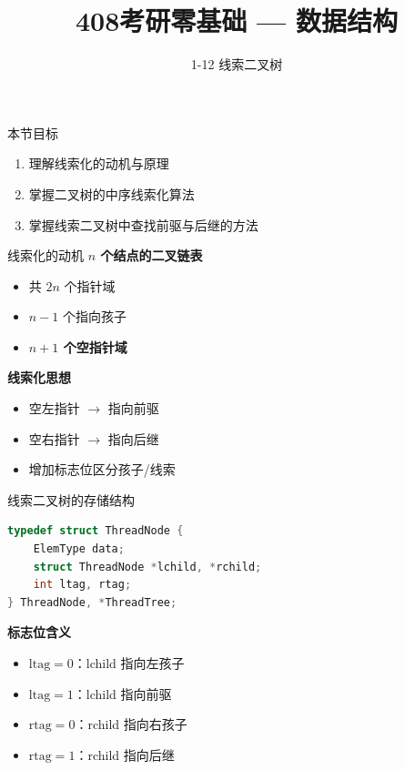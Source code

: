 \documentclass[10pt, aspectratio=169]{beamer}
\title{408考研零基础 --- 数据结构}
\subtitle{1-12 线索二叉树}
\author{}
\date{}
\begin{document}
\begin{frame}{本节目标}
    \begin{enumerate}
        \item 理解线索化的动机与原理
        \item 掌握二叉树的中序线索化算法
        \item 掌握线索二叉树中查找前驱与后继的方法
    \end{enumerate}
\end{frame}

\begin{frame}{线索化的动机}
    \textbf{$n$ 个结点的二叉链表}
    \begin{itemize}
        \item 共 $2n$ 个指针域
        \item $n-1$ 个指向孩子
        \item \textbf{$n+1$ 个空指针域}
    \end{itemize}
    \vspace{0.5em}
    \textbf{线索化思想}
    \begin{itemize}
        \item 空左指针 $\to$ 指向前驱
        \item 空右指针 $\to$ 指向后继
        \item 增加标志位区分孩子/线索
    \end{itemize}
\end{frame}

\begin{frame}[fragile]{线索二叉树的存储结构}
    \begin{lstlisting}[language=C, basicstyle=\ttfamily\small]
typedef struct ThreadNode {
    ElemType data;
    struct ThreadNode *lchild, *rchild;
    int ltag, rtag;
} ThreadNode, *ThreadTree;
    \end{lstlisting}
    \vspace{0.5em}
    \textbf{标志位含义}
    \begin{itemize}
        \item $\text{ltag} = 0$：lchild 指向左孩子
        \item $\text{ltag} = 1$：lchild 指向前驱
        \item $\text{rtag} = 0$：rchild 指向右孩子
        \item $\text{rtag} = 1$：rchild 指向后继
    \end{itemize}
\end{frame}
\end{document}
